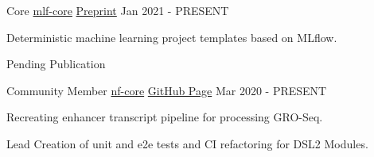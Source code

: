 

\begin{cventries}


	\cventry
	{Core} %
	{\href{https://www.mlf-core.com/index}{mlf-core}} %
	{\href{https://arxiv.org/abs/2104.07651}{Preprint}}
	{Jan 2021 - PRESENT} %
	{
		\begin{cvitems} %
			\item {Deterministic machine learning project templates based on MLflow.}
			\item {Pending Publication}
		\end{cvitems}
	}

	\cventry
	{Community Member} %
	{\href{https://nf-co.re/}{nf-core}} %
	{\href{https://github.com/nf-core}{GitHub Page}} %
	{Mar 2020 - PRESENT} %
	{
		\begin{cvitems} %
			\item {Recreating enhancer transcript pipeline for processing GRO-Seq.}
			\item {Lead Creation of unit and e2e tests and CI refactoring for DSL2 Modules.}
		\end{cvitems}
	}




\end{cventries}
